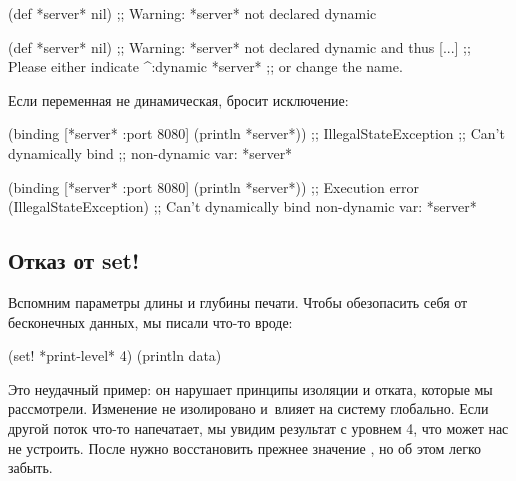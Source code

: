 \pagebreakafive

\ifnarrow

\begin{clojure}
(def *server* nil)
;; Warning: *server* not declared dynamic
\end{clojure}

\else

\begin{clojure}
(def *server* nil)
;; Warning: *server* not declared dynamic and thus [...]
;; Please either indicate ^:dynamic *server*
;; or change the name.
\end{clojure}

\fi

\noindent
Если переменная не динамическая,  бросит исключение:

\ifnarrow

\begin{clojure}
(binding [*server* {:port 8080}]
  (println *server*))
;; IllegalStateException
;; Can't dynamically bind
;; non-dynamic var: *server*
\end{clojure}

\else

\begin{clojure}
(binding [*server* {:port 8080}]
  (println *server*))
;; Execution error (IllegalStateException)
;; Can't dynamically bind non-dynamic var: *server*
\end{clojure}

\fi

\subsection{Отказ от set!}

Вспомним параметры длины и глубины печати. Чтобы обезопасить себя от бесконечных
данных, мы писали что-то вроде:

\begin{clojure}
(set! *print-level* 4)
(println data)
\end{clojure}


Это неудачный пример: он нарушает принципы изоляции и отката, которые мы
рассмотрели. Изменение  не изолировано и~влияет на систему
глобально. Если другой поток что-то напечатает, мы увидим результат с уровнем 4,
что может нас не устроить. После  нужно восстановить
прежнее значение , но об этом легко забыть.

